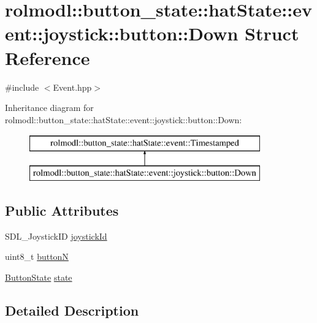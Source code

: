 \hypertarget{structrolmodl_1_1button__state_1_1hat_state_1_1event_1_1joystick_1_1button_1_1_down}{}\section{rolmodl\+::button\+\_\+state\+::hat\+State\+::event\+::joystick\+::button\+::Down Struct Reference}
\label{structrolmodl_1_1button__state_1_1hat_state_1_1event_1_1joystick_1_1button_1_1_down}


{\ttfamily \#include $<$Event.\+hpp$>$}

Inheritance diagram for rolmodl\+::button\+\_\+state\+::hat\+State\+::event\+::joystick\+::button\+::Down\+:\begin{figure}[H]
\begin{center}
\leavevmode
\includegraphics[height=2.000000cm]{structrolmodl_1_1button__state_1_1hat_state_1_1event_1_1joystick_1_1button_1_1_down}
\end{center}
\end{figure}
\subsection*{Public Attributes}
\begin{DoxyCompactItemize}
\item 
S\+D\+L\+\_\+\+Joystick\+ID \mbox{\hyperlink{structrolmodl_1_1button__state_1_1hat_state_1_1event_1_1joystick_1_1button_1_1_down_ab46d89a8deb1cf3ab5dc04c9e2dad6e6}{joystick\+Id}}
\item 
uint8\+\_\+t \mbox{\hyperlink{structrolmodl_1_1button__state_1_1hat_state_1_1event_1_1joystick_1_1button_1_1_down_a19db960acab5ff2731f0ea45ef962e81}{buttonN}}
\item 
\mbox{\hyperlink{namespacerolmodl_ad08ec5c56aa1db118f871357b2d475fd}{Button\+State}} \mbox{\hyperlink{structrolmodl_1_1button__state_1_1hat_state_1_1event_1_1joystick_1_1button_1_1_down_ae901f04ef8f570aef1a797d73c105780}{state}}
\end{DoxyCompactItemize}


\subsection{Detailed Description}


